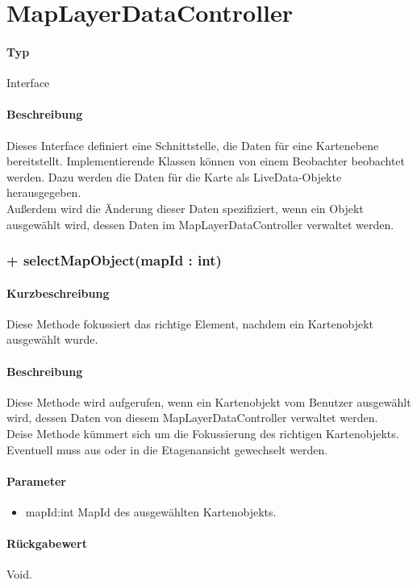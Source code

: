\section{MapLayerDataController}
\paragraph*{Typ} 
Interface
\paragraph*{Beschreibung}
Dieses Interface definiert eine Schnittstelle, die Daten für eine Kartenebene bereitstellt.
Implementierende Klassen können von einem Beobachter beobachtet werden. Dazu werden die 
Daten für die Karte als LiveData-Objekte herausgegeben.\\
Außerdem wird die Änderung dieser Daten spezifiziert, wenn ein Objekt ausgewählt wird, dessen
Daten im MapLayerDataController verwaltet werden.

\subsubsection{+ selectMapObject(mapId : int)}%
\paragraph*{Kurzbeschreibung}
Diese Methode fokussiert das richtige Element, nachdem ein Kartenobjekt ausgewählt wurde.
\paragraph*{Beschreibung}
Diese Methode wird aufgerufen, wenn ein Kartenobjekt vom Benutzer ausgewählt wird, dessen 
Daten von diesem MapLayerDataController verwaltet werden.\\
Deise Methode kümmert sich um die Fokussierung des richtigen Kartenobjekts. Eventuell muss 
aus oder in die Etagenansicht gewechselt werden.
\paragraph*{Parameter}
\begin{itemize}
    \item mapId:int MapId des ausgewählten Kartenobjekts.
\end{itemize}
\paragraph*{Rückgabewert}
Void.

